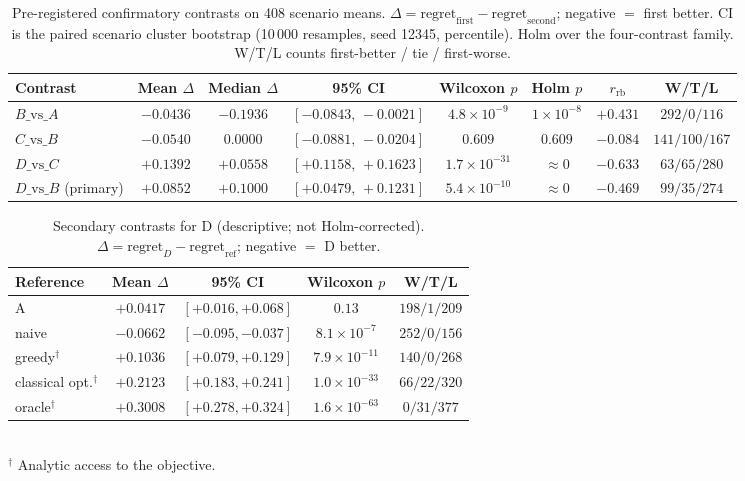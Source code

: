 \documentclass[conference]{IEEEtran}
\newcommand{\rb}{\ensuremath{r_{\mathrm{rb}}}}
\begin{document}
\begin{table}[!t]
\caption{Pre-registered confirmatory contrasts on 408 scenario means.
$\Delta = \mathrm{regret}_{\text{first}}-\mathrm{regret}_{\text{second}}$;
negative $=$ first better. CI is the paired scenario cluster bootstrap
(10\,000 resamples, seed 12345, percentile). Holm over the four-contrast family.
W/T/L counts first-better / tie / first-worse.}
\label{tab:confirm}
\centering
\begin{tabular}{lccccccc}
\toprule
Contrast & Mean $\Delta$ & Median $\Delta$ & 95\% CI & Wilcoxon $p$ & Holm $p$ & \rb & W/T/L \\
\midrule
$B\text{\_vs\_}A$ & $-0.0436$ & $-0.1936$ & $[-0.0843,\,-0.0021]$ & $4.8\times10^{-9}$ & $1\times10^{-8}$ & $+0.431$ & $292/0/116$ \\
$C\text{\_vs\_}B$ & $-0.0540$ & $0.0000$ & $[-0.0881,\,-0.0204]$ & $0.609$ & $0.609$ & $-0.084$ & $141/100/167$ \\
$D\text{\_vs\_}C$ & $+0.1392$ & $+0.0558$ & $[+0.1158,\,+0.1623]$ & $1.7\times10^{-31}$ & $\approx0$ & $-0.633$ & $63/65/280$ \\
$D\text{\_vs\_}B$ (primary) & $+0.0852$ & $+0.1000$ & $[+0.0479,\,+0.1231]$ & $5.4\times10^{-10}$ & $\approx0$ & $-0.469$ & $99/35/274$ \\
\bottomrule
\end{tabular}
\end{table}

\begin{table}[!t]
\caption{Secondary contrasts for D (descriptive; not Holm-corrected).
$\Delta = \mathrm{regret}_D-\mathrm{regret}_{\text{ref}}$; negative $=$ D better.}
\label{tab:secondary}
\centering
\begin{tabular}{lcccc}
\toprule
Reference & Mean $\Delta$ & 95\% CI & Wilcoxon $p$ & W/T/L \\
\midrule
A                   & $+0.0417$ & $[+0.016,+0.068]$ & $0.13$              & $198/1/209$ \\
naive               & $-0.0662$ & $[-0.095,-0.037]$ & $8.1\times10^{-7}$  & $252/0/156$ \\
greedy$^\dagger$    & $+0.1036$ & $[+0.079,+0.129]$ & $7.9\times10^{-11}$ & $140/0/268$ \\
classical opt.$^\dagger$ & $+0.2123$ & $[+0.183,+0.241]$ & $1.0\times10^{-33}$ & $66/22/320$ \\
oracle$^\dagger$    & $+0.3008$ & $[+0.278,+0.324]$ & $1.6\times10^{-63}$ & $0/31/377$ \\
\bottomrule
\end{tabular}\\[2pt]
{\footnotesize $^\dagger$ Analytic access to the objective.}
\end{table}
\end{document}
